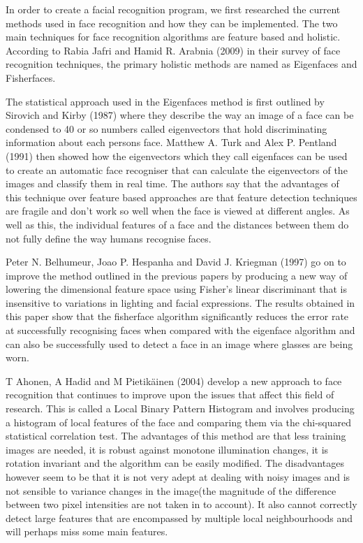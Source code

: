 In order to create a facial recognition program, we first researched the current methods used in face recognition and how they can be implemented. The two main techniques for face recognition algorithms are feature based and holistic. According to Rabia Jafri and Hamid R. Arabnia (2009)\cite{FR_survey} in their survey of face recognition techniques, the primary holistic methods are named as Eigenfaces and Fisherfaces.

The statistical approach used in the Eigenfaces method is first outlined by Sirovich and Kirby (1987)\cite{sirovich1987low} where they describe the way an image of a face can be condensed to 40 or so numbers called eigenvectors that hold discriminating information about each persons face.
Matthew A. Turk and Alex P. Pentland (1991)\cite{turk1991face} then showed how the eigenvectors which they call eigenfaces can be used to create an automatic face recogniser that can calculate the eigenvectors of the images and classify them in real time. The authors say that the advantages of this technique over feature based approaches are that feature detection techniques are fragile and don't work so well when the face is viewed at different angles. As well as this, the individual features of a face and the distances between them do not fully define the way humans recognise faces.

Peter N. Belhumeur, Joao P. Hespanha and David J. Kriegman (1997)\cite{Eigenfaces_vs_Fisherfaces} go on to improve the method outlined in the previous papers by producing a new way of lowering the dimensional feature space using Fisher's linear discriminant that is insensitive to variations in lighting and facial expressions. The results obtained in this paper show that the fisherface algorithm significantly reduces the error rate at successfully recognising faces when compared with the eigenface algorithm and can also be successfully used to detect a face in an image where glasses are being worn.


T Ahonen, A Hadid and M Pietik\"{a}inen (2004)\cite{ahonen2004face} develop a new approach to face recognition that continues to improve upon the issues that affect this field of research. This is called a Local Binary Pattern Histogram and involves producing a histogram of local features of the face and comparing them via the chi-squared statistical correlation test. The advantages of this method are that less training images are needed, it is robust against monotone illumination changes, it is rotation invariant and the algorithm can be easily modified. The disadvantages however seem to be that it is not very adept at dealing with noisy images and is not sensible to variance changes in the image(the magnitude of the difference between two pixel intensities are not taken in to account). It also cannot correctly detect large features that are encompassed by multiple local neighbourhoods and will perhaps miss some main features.

